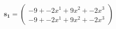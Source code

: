 \documentclass[preview]{standalone}
\begin{document}
\begin{align*}
\mathbf{s_1} = \begin{pmatrix}-9 + -2x^{1} + 9x^{2} + -2x^{3} \\ -9 + -2x^{1} + 9x^{2} + -2x^{3}\end{pmatrix}
\end{align*}
\end{document}
